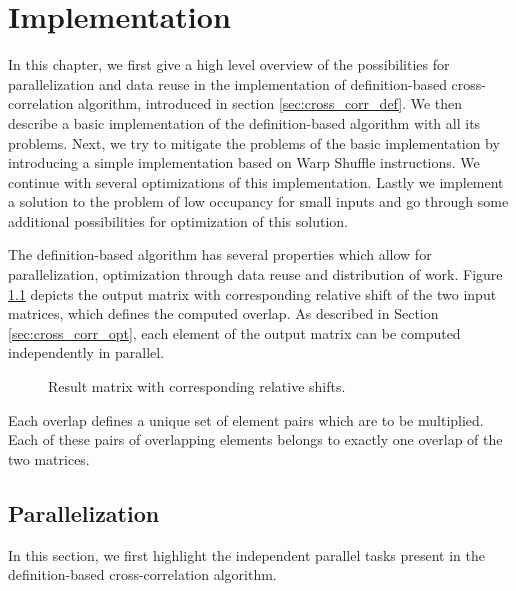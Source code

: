 \chapter{Implementation}

In this chapter, we first give a high level overview of the possibilities for parallelization and data reuse in the implementation of definition-based cross-correlation algorithm, introduced in section \ref{sec:cross_corr_def}. We then describe a basic implementation of the definition-based algorithm with all its problems. Next, we try to mitigate the problems of the basic implementation by introducing a simple implementation based on Warp Shuffle instructions. We continue with several optimizations of this implementation. Lastly we implement a solution to the problem of low occupancy for small inputs and go through some additional possibilities for optimization of this solution.


The definition-based algorithm has several properties which allow for parallelization, optimization through data reuse and distribution of work. Figure \ref{fig:cross_corr_shifts} depicts the output matrix with corresponding relative shift of the two input matrices, which defines the computed overlap. As described in Section \ref{sec:cross_corr_opt}, each element of the output matrix can be computed independently in parallel.

\begin{figure}[ht]
	\fontsize{6}{8}\selectfont
	\centering
	\def\svgwidth{0.55\textwidth}
	
	\caption{Result matrix with corresponding relative shifts.}
	\label{fig:cross_corr_shifts}
\end{figure}

Each overlap defines a unique set of element pairs which are to be multiplied. Each of these pairs of overlapping elements belongs to exactly one overlap of the two matrices.


\section{Parallelization}
\label{sec:implementation_parallelism}
In this section, we first highlight the independent parallel tasks present in the definition-based cross-correlation algorithm.  

